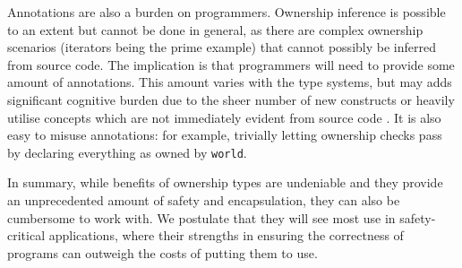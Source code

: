 \documentclass{acm_proc_article-sp}
\begin{document}
Annotations are also a burden on programmers. Ownership inference
\cite{boyapati04safejava} is possible to an extent but cannot be done in
general, as there are complex ownership scenarios (iterators being the prime
example) that cannot possibly be inferred from source code. The implication is
that programmers will need to provide some amount of annotations. This amount
varies with the type systems, but may adds significant cognitive burden due to
the sheer number of new constructs \cite{boyapati04safejava} or heavily utilise
concepts which are not immediately evident from source code
\cite{cameron07mojo}. It is also easy to misuse annotations: for example,
trivially letting ownership checks pass by declaring everything as owned by
\lstinline|world|.

In summary, while benefits of ownership types are undeniable and they provide
an unprecedented amount of safety and encapsulation, they can also be cumbersome
to work with. We postulate that they will see most use in safety-critical
applications, where their strengths in ensuring the correctness of programs can
outweigh the costs of putting them to use.
\end{document}
